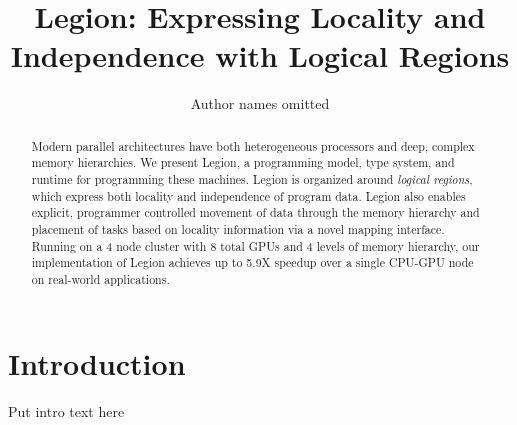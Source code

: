 \documentclass{IEEEtran}
\begin{document}
\pdfpagewidth=8.5in
\pdfpageheight=11in

\title{Legion: Expressing Locality and Independence with Logical Regions}
\author{Author names omitted}

\maketitle


\begin{abstract}
Modern parallel architectures have both
heterogeneous processors and deep, complex memory hierarchies.  
We present Legion, 
a programming model, type system, and runtime for programming these machines.
Legion is organized around {\em logical regions}, which express both locality and independence of program data.  
Legion also enables explicit, programmer controlled movement of data through
the memory hierarchy and placement of tasks based on locality information
via a novel mapping interface.  Running on a 4 node cluster with 8 total GPUs 
and 4 levels of memory hierarchy, our implementation of Legion 
achieves up to 5.9X speedup over a single CPU-GPU node on real-world applications.
\end{abstract}

\section{Introduction}
\label{sect:intro}
Put intro text here \cite{Fatahalian06}

%

%

%
%

%
%

%
%
%
%

{
\tiny

}
\end{document}
